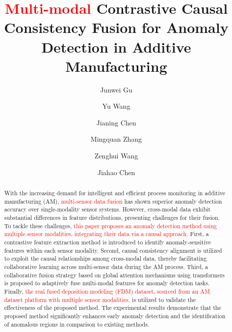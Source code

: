 \documentclass[preprint,12pt]{elsarticle}
\begin{document}
\begin{frontmatter}

\title{\textcolor{red}{Multi-modal} Contrastive Causal Consistency Fusion for Anomaly Detection in Additive Manufacturing}



\author[inst1]{Junwei Gu}
\author[inst1]{Yu Wang}
\author[inst1]{Jianing Chen}
\author[inst1]{Mingquan Zhang}
\author[inst2]{Zenghui Wang}
\author[inst1]{Jiahao Chen}



\begin{abstract}
  
  With the increasing demand for intelligent and efficient process monitoring in additive manufacturing (AM), \textcolor{red}{multi-sensor data fusion} has shown superior anomaly detection accuracy over single-modality sensor systems. However, cross-modal data exhibit substantial differences in feature distributions, presenting challenges for their fusion. To tackle these challenges, \textcolor{red}{this paper proposes an anomaly detection method using multiple sensor modalities, integrating their data via a causal approach.} First, a contrastive feature extraction method is introduced to identify anomaly-sensitive features within each sensor modality. Second, causal consistency alignment is utilized to exploit the causal relationships among cross-modal data, thereby facilitating collaborative learning across multi-sensor data during the AM process. Third, a collaborative fusion strategy based on global attention mechanisms using transformers is proposed to adaptively fuse multi-modal features for anomaly detection tasks. Finally, \textcolor{red}{the real fused deposition modeling (FDM) dataset, sourced from an AM dataset platform with multiple sensor modalities,} is utilized to validate the effectiveness of the proposed method. The experimental results demonstrate that the proposed method significantly enhances early anomaly detection and the identification of anomalous regions in comparison to existing methods.


\end{abstract}
\end{frontmatter}
\end{document}
